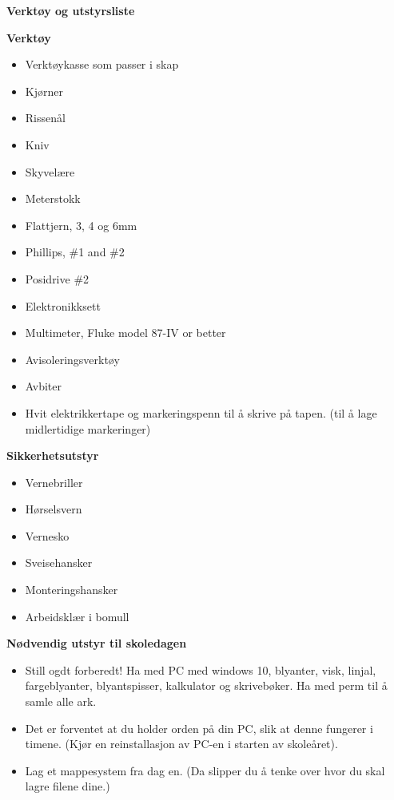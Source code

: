 \documentclass[12pt,a4paper]{book}
\begin{document}


\centerline{\bf Verktøy og utstyrsliste }

\vskip 10pt


\noindent
{\bf Verktøy}
\begin{itemize}[itemsep=1mm, parsep=0pt]
	\item Verktøykasse som passer i skap 
	\item Kjørner
	\item Rissenål
	\item Kniv
	\item Skyvelære
	\item Meterstokk
	\item Flattjern, 3, 4 og 6mm
	\item Phillips, \#1 and \#2
	\item Posidrive \#2
	\item Elektronikksett
	\item Multimeter, Fluke model 87-IV or better
	\item Avisoleringsverktøy
	\item Avbiter
	\item Hvit elektrikkertape og markeringspenn til å skrive på tapen. (til å lage midlertidige markeringer)
\medskip
\end{itemize}
\vskip 10pt

\noindent
{\bf Sikkerhetsutstyr}
\begin{itemize}[itemsep=1mm, parsep=0pt]
	\item Vernebriller
	\item Hørselsvern
	\item Vernesko
	\item Sveisehansker
	\item Monteringshansker
	\item Arbeidsklær i bomull
\medskip
\end{itemize}
\vskip 10pt

\noindent
{\bf Nødvendig utstyr til skoledagen}
\begin{itemize}[itemsep=1mm, parsep=0pt]
	
	\item Still ogdt forberedt! Ha med PC med windows 10, blyanter, visk, linjal, fargeblyanter, blyantspisser, kalkulator og skrivebøker. Ha med perm til å samle alle ark.
	\item Det er forventet at du holder orden på din PC, slik at denne fungerer i timene. (Kjør en reinstallasjon av PC-en i starten av skoleåret). 
	\item Lag et mappesystem fra dag en. (Da slipper du å tenke over hvor du skal lagre filene dine.)
\medskip
\end{itemize}
\vskip 10pt



\vfil

\eject
\end{document}

